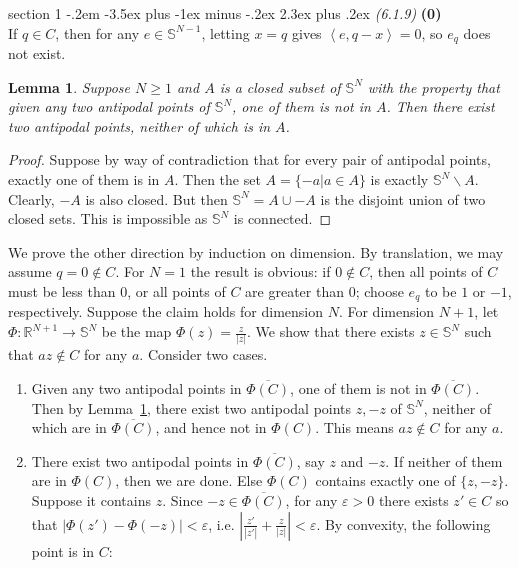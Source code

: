 \documentclass[12pt]{article}
\makeatletter
\theoremstyle{norm}
\newtheorem{lem}[thm]{Lemma}
\newcommand{\R}[0]{\mathbb{R}}
\newcommand{\bS}[0]{\mathbb{S}}
\newcommand{\nin}[0]{\not\in}
\newcommand{\subeq}[0]{\subseteq}
\newcommand{\ep}[0]{\varepsilon}
\newcommand{\ab}[1]{\left| {#1} \right|}
\newcommand{\pa}[1]{\left( {#1} \right)}
\newcommand{\an}[1]{\left\langle {#1}\right\rangle}
\newcommand{\subprob}[1]{\noindent\textbf{#1}\\}
\newcommand{\bs}[0]{\backslash}
\newcommand{\ol}[1]{\overline{#1}}
\newenvironment{problem}{\@startsection
       {section}
       {1}
       {-.2em}
       {-3.5ex plus -1ex minus -.2ex}
       {2.3ex plus .2ex}
       {\pagebreak[3]%
       \large\bf\noindent{Problem }
       }
       }
       {%
       }
\makeatother
\begin{document}
\begin{problem}{\it(6.1.9)}
\subprob{(0)}
If $q\in C$, then for any $e\in \bS^{N-1}$, %
letting $x=q$ gives $\an{e,q-x}=0$, so $e_q$ does not exist.


\begin{lem}\label{p5-8-l1}
Suppose $N\ge 1$ and $A$ is a closed subset of $\bS^N$ with the property that given any two antipodal points of $\bS^N$, one of them is not in $A$. Then there exist two antipodal points, neither of which is in $A$.
\end{lem}
\begin{proof}
Suppose by way of contradiction that for every pair of antipodal points, exactly one of them is in $A$. Then the set $A=\{-a|a\in A\}$ is exactly $\bS^N\bs A$. Clearly, $-A$ is also closed. But then $\bS^N=A\cup -A$ is the disjoint union of two closed sets. This is impossible as $\bS^N$ is connected.
\end{proof}
We prove the other direction by induction on dimension. By translation, we may assume $q=0\nin C$.
For $N=1$ the result is obvious: if $0\nin C$, then all points of $C$ must be less than $0$, or all points of $C$ are greater than $0$; choose $e_q$ to be $1$ or $-1$, respectively. Suppose the claim holds for dimension $N$. For dimension $N+1$, let $\Phi:\R^{N+1}\to \bS^N$ be the map $\Phi(z)=\frac{z}{|z|}$. %
We show that there exists $z\in \bS^{N}$ such that $az\nin C$ for any $a$. Consider two cases.
\begin{enumerate}
\item Given any two antipodal points in $\ol{\Phi(C)}$, one of them is not in $\ol{\Phi(C)}$. Then by Lemma~\ref{p5-8-l1}, there exist two antipodal points $z,-z$ of $\bS^N$, neither of which are in $\ol{\Phi(C)}$, and hence not in $\Phi(C)$. This means $az\nin C$ for any $a$. 
\item There exist two antipodal points in $\ol{\Phi(C)}$, say $z$ and $-z$. If neither of them are in $\Phi(C)$, then we are done. %
Else $\Phi(C)$ contains exactly one of $\{z,-z\}$. Suppose it contains $z$. Since $-z\in \ol{\Phi(C)}$, for any $\ep>0$ there exists $z'\in C$ so that $|\Phi(z')-\Phi(-z)|<\ep$, i.e. $\ab{\frac{z'}{|z'|}+\frac{z}{|z|}}<\ep$. By convexity, the following point is in $C$:

\end{enumerate}
\end{problem}
\end{document}
